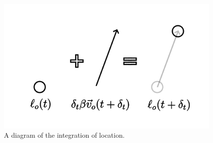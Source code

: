 \documentclass[12pt]{article}
\begin{document}
\begin{figure} 
\centering
\label{fig8}
  \includegraphics[width = 6 in]{location.png}
  \caption{
A diagram of the integration of location.
}
\end{figure}
\end{document}
